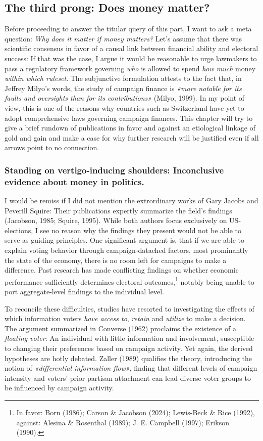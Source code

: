 \documentclass[11pt,a4paper]{article}
\begin{document}
\subsection{The third prong: Does money matter?}
Before proceeding to answer the titular query of this part, I want to ask a meta question: \textit{Why does it matter if money matters?} Let’s assume that there was scientific consensus in favor of a causal link between financial ability and electoral success: If that was the case, I argue it would be reasonable to urge lawmakers to pass a regulatory framework governing \textit{who} is allowed to spend \textit{how much} money \textit{within which ruleset}. The subjunctive formulation attests to the fact that, in Jeffrey Milyo’s words, the study of campaign finance is \textit{«more notable for its faults and oversights than for its contributions»} (Milyo, 1999). In my point of view, this is one of the reasons why countries such as Switzerland have yet to adopt comprehensive laws governing campaign finances. This chapter will try to give a brief rundown of publications in favor and against an etiological linkage of gold and gain and make a case for why further research will be justified even if all arrows point to no connection.

\subsubsection{Standing on vertigo-inducing shoulders: Inconclusive evidence about money in politics.}
I would be remiss if I did not mention the extrordinary works of Gary Jacobs and Peverill Squire: Their publications expertly summarize the field’s findings (Jacobson, 1985; Squire, 1995). While both authors focus exclusively on US-elections, I see no reason why the findings they present would not be able to serve as guiding principles. One significant argument is, that if we are able to explain voting behavior through campaign-datached factors, most prominantly the state of the economy, there is no room left for campaigns to make a difference. Past research has made conflicting findings on whether economic performance sufficiently determines electoral outcomes,\footnote{In favor: Born (1986); Carson \& Jacobson (2024); Lewis-Beck \& Rice (1992), against: Alesina \& Rosenthal (1989); J. E. Campbell (1997); Erikson (1990).} notably being unable to port aggregate-level findings to the individual level.

To reconcile these difficulties, studies have resorted to investigating the effects of which information voters \textit{have access to}, \textit{retain} and \textit{utilize} to make a decision. The argument summarized in Converse (1962) proclaims the existence of a \textit{floating voter}: An individual with little information and involvement, susceptible to changing their preferences based on campaign activity. Yet again, the derived hypotheses are hotly debated. Zaller (1989) qualifies the theory, introducing the notion of \textit{«differential information flow»}, finding that different levels of campaign intensity and voters’ prior partisan attachment can lead diverse voter groups to be influenced by campaign activity.
\end{document}
